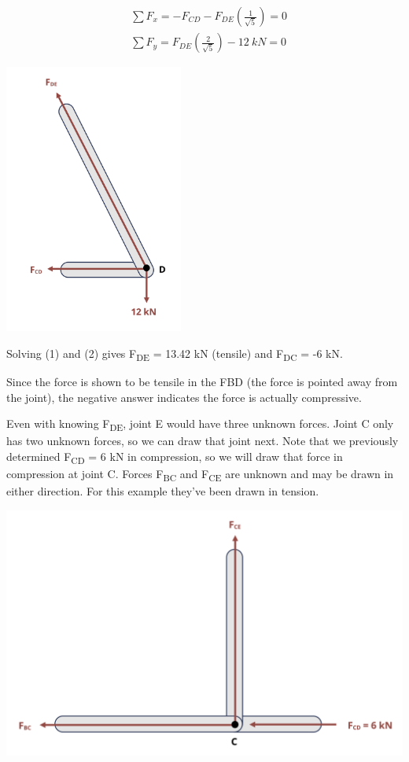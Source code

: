 \documentclass[
  letterpaper,
  DIV=11,
  numbers=noendperiod]{scrreprt}
\theoremstyle{definition}
\theoremstyle{remark}
\begin{document}
\begin{tcolorbox}
\begin{tcolorbox}
\[
\begin{aligned}
& \sum F_x=-F_{C D}-F_{D E}\left(\frac{1}{\sqrt{5}}\right)=0 \\
& \sum F_y=F_{D E}\left(\frac{2}{\sqrt{5}}\right)-12{~kN}=0
\end{aligned}
\]

\begin{center}
\includegraphics[width=2.3125in,height=\textheight]{images/CH1 PNGs/example 1.4 part 2.png}
\end{center}

Solving (1) and (2) gives F\textsubscript{DE} = 13.42 kN (tensile) and
F\textsubscript{DC} = -6 kN.

Since the force is shown to be tensile in the FBD (the force is pointed
away from the joint), the negative answer indicates the force is
actually compressive.

Even with knowing F\textsubscript{DE}, joint E would have three unknown
forces. Joint C only has two unknown forces, so we can draw that joint
next. Note that we previously determined F\textsubscript{CD} = 6 kN in
compression, so we will draw that force in compression at joint C.
Forces F\textsubscript{BC} and F\textsubscript{CE} are unknown and may
be drawn in either direction. For this example they've been drawn in
tension.

\begin{center}
\includegraphics[width=5.34375in,height=\textheight]{images/CH1 PNGs/example 1.4 part 3.png}
\end{center}


\end{tcolorbox}
\end{tcolorbox}
\end{document}
